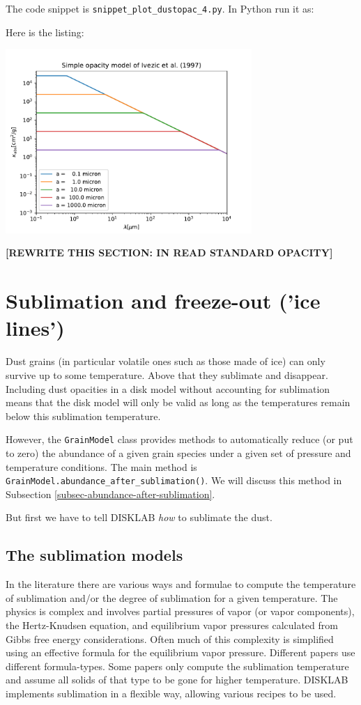 \documentclass{book}
\newcommand{\code}[1]{{\small\tt #1}}
\begin{document}
The code snippet is
\code{snippet\_plot\_dustopac\_4.py}. In Python run it as:
\begin{codebox}
\end{codebox}
Here is the listing:

\centerline{\includegraphics[width=0.7\textwidth]{../snippets/fig_snippet_plot_dustopac_4_1.pdf}}

{\bf [REWRITE THIS SECTION: IN READ STANDARD OPACITY]}

\section{Sublimation and freeze-out ('ice lines')}
\label{sec-sublimation-and-freezeout}
%
Dust grains (in particular volatile ones such as those made of ice) can only survive up to
some temperature. Above that they sublimate and disappear. Including dust opacities in
a disk model without accounting for sublimation means that the disk model will only be valid
as long as the temperatures remain below this sublimation temperature.

However, the \code{GrainModel} class provides methods to automatically reduce (or put to
zero) the abundance of a given grain species under a given set of pressure and temperature
conditions. The main method is\\ \code{GrainModel.abundance\_after\_sublimation()}. We will
discuss this method in Subsection \ref{subsec-abundance-after-sublimation}.

But first we have to tell {\sf DISKLAB} {\em how} to sublimate the dust.

\subsection{The sublimation models}
%
In the literature there are various ways and formulae to compute the temperature
of sublimation and/or the degree of sublimation for a given temperature. The
physics is complex and involves partial pressures of vapor (or vapor
components), the Hertz-Knudsen equation, and equilibrium vapor pressures
calculated from Gibbs free energy considerations. Often much of this complexity
is simplified using an effective formula for the equilibrium vapor pressure.
Different papers use different formula-types. Some papers only compute the
sublimation temperature and assume all solids of that type to be gone for
higher temperature. {\sf DISKLAB} implements sublimation in a flexible way,
allowing various recipes to be used.
\end{document}
